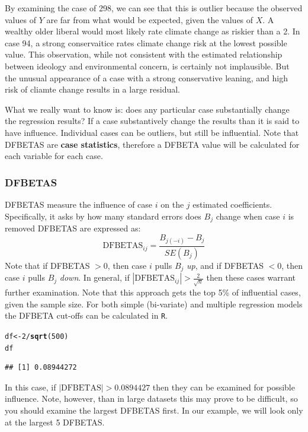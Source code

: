 \documentclass[11pt,openany]{book}\usepackage[]{graphicx}\usepackage[]{color}
\makeatletter
\newcommand{\hlnum}[1]{\textcolor[rgb]{0.686,0.059,0.569}{#1}}%
\newcommand{\hlopt}[1]{\textcolor[rgb]{0,0,0}{#1}}%
\newcommand{\hlstd}[1]{\textcolor[rgb]{0.345,0.345,0.345}{#1}}%
\newcommand{\hlkwb}[1]{\textcolor[rgb]{0.69,0.353,0.396}{#1}}%
\newcommand{\hlkwd}[1]{\textcolor[rgb]{0.737,0.353,0.396}{\textbf{#1}}}%
\newenvironment{kframe}{%
 \def\at@end@of@kframe{}%
 \ifinner\ifhmode%
  \def\at@end@of@kframe{\end{minipage}}%
  \begin{minipage}{\columnwidth}%
 \fi\fi%
 \def\FrameCommand##1{\hskip\@totalleftmargin \hskip-\fboxsep
 \colorbox{shadecolor}{##1}\hskip-\fboxsep
     \hskip-\linewidth \hskip-\@totalleftmargin \hskip\columnwidth}%
 \MakeFramed {\advance\hsize-\width
   \@totalleftmargin\z@ \linewidth\hsize
   \@setminipage}}%
 {\par\unskip\endMakeFramed%
 \at@end@of@kframe}
\newenvironment{knitrout}{}{} %
\renewenvironment{knitrout}{\begin{singlespace}}{\end{singlespace}} %
\makeatother
\begin{document}
By examining the case of 298, we can see that this is outlier because the observed values of $Y$ are far from what would be expected, given the values of $X$. A wealthy older liberal would most likely rate climate change as riskier than a 2. In case 94, a strong conservaitice rates climate change risk at the lowest possible value.  This observation, while not consistent with the estimated relationship between ideology and environmental concern, is certainly not implausible.  But the unusual appearance of a case with a strong conservative leaning, and high risk of cliamte change results in a large residual.

What we really want to know is: does any particular case substantially change the regression results? If a case  substantively change the results than it is said to have influence. Individual cases can be outliers, but still be influential.  Note that DFBETAS are \textbf{case statistics}, therefore a DFBETA value will be calculated for each variable for each case.   

\subsubsection{DFBETAS} 
DFBETAS measure the influence of case $i$ on the $j$ estimated coefficients. Specifically, it asks by how many standard errors does $B_j$ change when case $i$ is removed DFBETAS are expressed as:
\begin{equation}
  \label{eq:dfbeta}
  \text{DFBETAS}_{ij} = \frac{B_{j(-i)}-B_j}{SE(B_j)}
\end{equation}
Note that if DFBETAS $ > 0$, then case $i$ pulls $B_j$ \textit{up}, and  if DFBETAS $ < 0$, then case $i$ pulls $B_j$ \textit{down}.  In general, if $|\text{DFBETAS}_{ij}| > \frac{2}{\sqrt{n}}$ then these cases warrant further examination. Note that this approach gets the top 5\% of influential cases, given the sample size. For both simple (bi-variate) and  multiple regression models the DFBETA cut-offs can be calculated in \texttt{R}.  
\begin{knitrout}
\color{fgcolor}\begin{kframe}
\begin{alltt}
\hlstd{df} \hlkwb{<-} \hlnum{2}\hlopt{/}\hlkwd{sqrt}\hlstd{(}\hlnum{500}\hlstd{)}
\hlstd{df}
\end{alltt}
\begin{verbatim}
## [1] 0.08944272
\end{verbatim}
\end{kframe}
\end{knitrout}
\noindent In this case, if $|\text{DFBETAS}| > 0.0894427$ then they can be examined for  possible influence. Note, however, than in large datasets this may prove to be difficult,  so you should examine the largest DFBETAS first. In our example, we will look only at the largest 5 DFBETAS.
\end{document}

